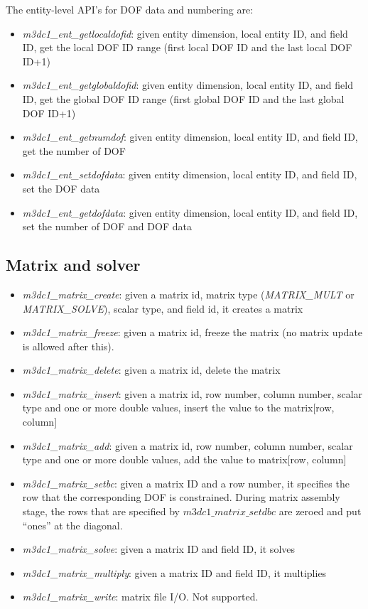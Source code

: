 \documentclass[11pt]{article}  %
\begin{document}
The entity-level API's for DOF data and numbering are:
\begin{itemize}
\item \emph{m3dc1\_ent\_getlocaldofid}: given entity dimension, local entity ID, and field ID, get the local DOF ID range (first local DOF ID and the last local DOF ID+1)
\item \emph{m3dc1\_ent\_getglobaldofid}: given entity dimension, local entity ID, and field ID, get the global DOF ID range (first global DOF ID and the last global DOF ID+1)
\item \emph{m3dc1\_ent\_getnumdof}: given entity dimension, local entity ID, and field ID, get the number of DOF
\item \emph{m3dc1\_ent\_setdofdata}: given entity dimension, local entity ID, and field ID, set the DOF data
\item \emph{m3dc1\_ent\_getdofdata}: given entity dimension, local entity ID, and field ID, set the number of DOF and DOF data
\end{itemize}

\subsection{Matrix and solver} \label{sec:step7}
\begin{itemize}
\item \emph{m3dc1\_matrix\_create}: given a matrix id, matrix type (\emph{MATRIX\_MULT} or \emph{MATRIX\_SOLVE}), scalar type, and field id, it creates a matrix
\item \emph{m3dc1\_matrix\_freeze}: given a matrix id, freeze the matrix (no matrix update is allowed after this).
\item \emph{m3dc1\_matrix\_delete}:  given a matrix id, delete the matrix

\item \emph{m3dc1\_matrix\_insert}: given a matrix id, row number, column number, scalar type and one or more double values,  insert the value to the matrix[row, column]
\item \emph{m3dc1\_matrix\_add}: given a matrix id, row number, column number, scalar type and one or more double values,  add the value to matrix[row, column]
\item \emph{m3dc1\_matrix\_setbc}: given a matrix ID and a row number, it specifies the row that the corresponding DOF is constrained. During matrix assembly stage, the rows that are specified by $ m3dc1\_matrix\_setdbc$ are zeroed and put ``ones'' at the diagonal.
\item \emph{m3dc1\_matrix\_solve}: given a matrix ID and field ID, it solves
\item \emph{m3dc1\_matrix\_multiply}: given a matrix ID and field ID, it multiplies
\item \emph{m3dc1\_matrix\_write}: matrix file I/O. Not supported.
\end{itemize}
\end{document}
